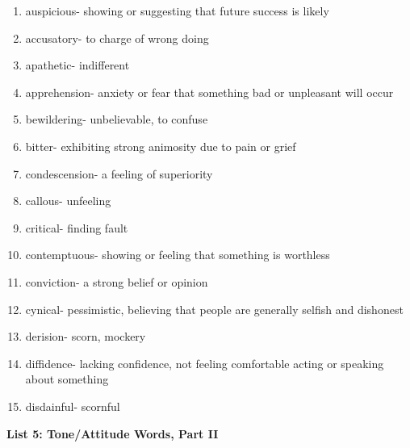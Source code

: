 \begin{enumerate}
\item auspicious- showing or suggesting that future success is likely

\item accusatory- to charge of wrong doing

\item apathetic- indifferent

 \item apprehension- anxiety or fear that something bad or unpleasant will occur
 
 \item bewildering- unbelievable, to confuse

\item bitter- exhibiting strong animosity due to pain or grief

\item condescension- a feeling of superiority

\item callous- unfeeling

\item critical- finding fault

\item contemptuous- showing or feeling that something is worthless

\item conviction- a strong belief or opinion

\item cynical- pessimistic, believing that people are generally selfish and dishonest

\item derision- scorn, mockery

\item diffidence- lacking confidence, not feeling comfortable acting or speaking about something

\item disdainful- scornful

\end{enumerate}

\textbf{List 5: Tone/Attitude Words, Part II}

